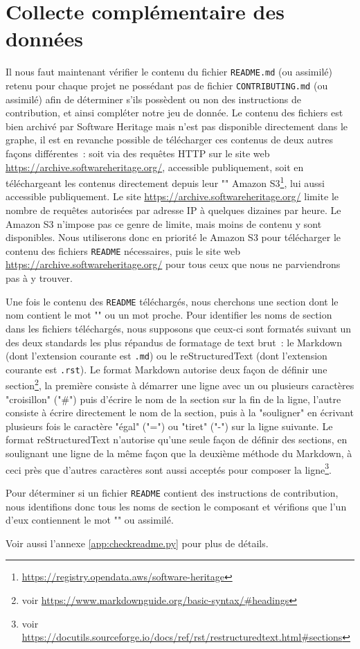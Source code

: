 \section{Collecte complémentaire des données}
\label{sec:collectreadme}

Il nous faut maintenant vérifier le contenu du fichier \texttt{README.md} (ou assimilé) retenu pour chaque
projet ne possédant pas de fichier \texttt{CONTRIBUTING.md} (ou assimilé) afin de déterminer s'ils possèdent
ou non des instructions de contribution, et ainsi compléter notre jeu de donnée. Le contenu des fichiers est
bien archivé par Software Heritage mais n'est pas disponible directement dans le graphe, il est en revanche
possible de télécharger ces contenus de deux autres façons différentes : soit via des requêtes HTTP sur le
site web \url{https://archive.softwareheritage.org/}, accessible publiquement, soit en téléchargeant les
contenus directement depuis leur "" Amazon
S3\footnote{\url{https://registry.opendata.aws/software-heritage}}, lui aussi accessible publiquement. Le site
\url{https://archive.softwareheritage.org/} limite le nombre de requêtes autorisées par adresse IP à quelques
dizaines par heure. Le  Amazon S3 n'impose pas ce genre de limite, mais moins de contenu y sont
disponibles. Nous utiliserons donc en priorité le  Amazon S3 pour télécharger le contenu des
fichiers \texttt{README} nécessaires, puis le site web \url{https://archive.softwareheritage.org/} pour tous
ceux que nous ne parviendrons pas à y trouver.

Une fois le contenu des \texttt{README} téléchargés, nous cherchons une section dont le nom contient le mot
"" ou un mot proche. Pour identifier les noms de section dans les fichiers téléchargés, nous
supposons que ceux-ci sont formatés suivant un des deux standards les plus répandus de formatage de text
brut : le Markdown (dont l'extension courante est \texttt{.md}) ou le reStructuredText (dont l'extension
courante est \texttt{.rst}). Le format Markdown autorise deux façon de définir une section\footnote{voir
\url{https://www.markdownguide.org/basic-syntax/\#headings}}, la première consiste à démarrer une ligne avec
un ou plusieurs caractères "croisillon" ("\#") puis d'écrire le nom de la section sur la fin de la ligne,
l'autre consiste à écrire directement le nom de la section, puis à la "souligner" en écrivant plusieurs fois
le caractère "égal" ("=") ou "tiret" ("-") sur la ligne suivante. Le format reStructuredText n'autorise qu'une
seule façon de définir des sections, en soulignant une ligne de la même façon que la deuxième méthode du
Markdown, à ceci près que d'autres caractères sont aussi acceptés pour composer la ligne\footnote{voir
\url{https://docutils.sourceforge.io/docs/ref/rst/restructuredtext.html\#sections}}.

Pour déterminer si un fichier \texttt{README} contient des instructions de contribution, nous identifions donc
tous les noms de section le composant et vérifions que l'un d'eux contiennent le mot "" ou
assimilé.

Voir aussi l'annexe \ref{app:checkreadme.py} pour plus de détails.
